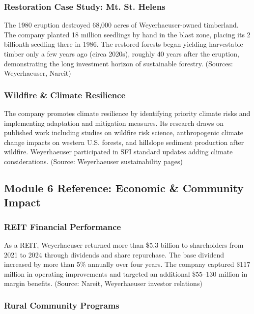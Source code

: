 \documentclass[11pt,letterpaper]{article}
\begin{document}
\subsubsection{Restoration Case Study: Mt. St. Helens}

The 1980 eruption destroyed 68,000 acres of Weyerhaeuser-owned timberland. The company planted 18 million seedlings by hand in the blast zone, placing its 2 billionth seedling there in 1986. The restored forests began yielding harvestable timber only a few years ago (circa 2020s), roughly 40 years after the eruption, demonstrating the long investment horizon of sustainable forestry. (Sources: Weyerhaeuser, Nareit)

\subsubsection{Wildfire \& Climate Resilience}

The company promotes climate resilience by identifying priority climate risks and implementing adaptation and mitigation measures. Its research draws on published work including studies on wildfire risk science, anthropogenic climate change impacts on western U.S. forests, and hillslope sediment production after wildfire. Weyerhaeuser participated in SFI standard updates adding climate considerations. (Source: Weyerhaeuser sustainability pages)

\subsection{Module 6 Reference: Economic \& Community Impact}

\subsubsection{REIT Financial Performance}

As a REIT, Weyerhaeuser returned more than \$5.3 billion to shareholders from 2021 to 2024 through dividends and share repurchase. The base dividend increased by more than 5\% annually over four years. The company captured \$117 million in operating improvements and targeted an additional \$55--130 million in margin benefits. (Source: Nareit, Weyerhaeuser investor relations)

\subsubsection{Rural Community Programs}
\end{document}
